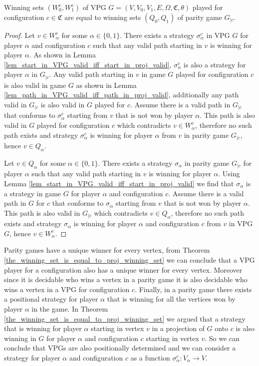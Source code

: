 \begin{theorem}
	\label{the_winning_set_is_equal_to_proj_winning_set}
	Winning sets $(W_0^c, W_1^c)$ of VPG $G = (V,V_0,V_1,E,\Omega,\mathfrak{C},\theta)$ played for configuration $c \in \mathfrak{C}$ are equal to winning sets $(Q_0,Q_1)$ of parity game $G_{|c}$.
	\begin{proof}
		Let $v \in W_\alpha^c$ for some $\alpha \in \{0,1\}$. There exists a strategy $\sigma_\alpha^c$ in VPG $G$ for player $\alpha$ and configuration $c$ such that any valid path starting in $v$ is winning for player $\alpha$. As shown in Lemma \ref{lem_start_in_VPG_valid_iff_start_in_proj_valid}, $\sigma_\alpha^c$ is also a strategy for player $\alpha$ in $G_{|c}$. Any valid path starting in $v$ in game $G$ played for configuration $c$ is also valid in game $G$ as shown in Lemma \ref{lem_path_in_VPG_valid_iff_path_in_proj_valid}, additionally any path valid in $G_{|c}$ is also valid in $G$ played for $c$. Assume there is a valid path in $G_{|c}$ that conforms to $\sigma_\alpha^c$ starting from $v$ that is not won by player $\alpha$. This path is also valid in $G$ played for configuration $c$ which contradicts $v \in W_\alpha^c$, therefore no such path exists and strategy $\sigma_\alpha^c$ is winning for player $\alpha$ from $v$ in parity game $G_{|c}$, hence $v \in Q_\alpha$.
		
		Let $v \in Q_\alpha$ for some $\alpha \in \{0,1\}$. There exists a strategy $\sigma_\alpha$ in parity game $G_{|c}$ for player $\alpha$ such that any valid path starting in $v$ is winning for player $\alpha$. Using Lemma \ref{lem_start_in_VPG_valid_iff_start_in_proj_valid} we find that $\sigma_\alpha$ is a strategy in game $G$ for player $\alpha$ and configuration $c$. Assume there is a valid path in $G$ for $c$ that conforms to $\sigma_\alpha$ starting from $v$ that is not won by player $\alpha$. This path is also valid in $G_{|c}$ which contradicts $v \in Q_\alpha$, therefore no such path exists and strategy $\sigma_\alpha$ is winning for player $\alpha$ and configuration $c$ from $v$ in VPG $G$, hence $v \in W_\alpha^c$.
	\end{proof}
\end{theorem}

Parity games have a unique winner for every vertex, from Theorem \ref{the_winning_set_is_equal_to_proj_winning_set} we can conclude that a VPG player for a configuration also has a unique winner for every vertex. Moreover since it is decidable who wins a vertex in a parity game it is also decidable who wins a vertex in a VPG for configuration $c$. Finally, in a parity game there exists a positional strategy for player $\alpha$ that is winning for all the vertices won by player $\alpha$ in the game. In Theorem \ref{the_winning_set_is_equal_to_proj_winning_set} we argued that a strategy that is winning for player $\alpha$ starting in vertex $v$ in a projection of $G$ onto $c$ is also winning in $G$ for player $\alpha$ and configuration $c$ starting in vertex $v$. So we can conclude that VPGs are also positionally determined and we can consider a strategy for player $\alpha$ and configuration $c$ as a function $\sigma_\alpha^c : V_\alpha \rightarrow V$.

